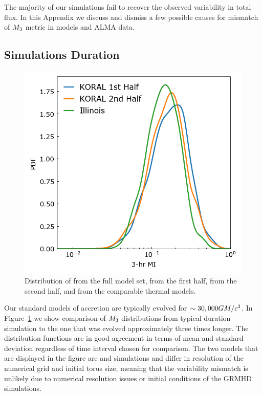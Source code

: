 

The majority of our simulations fail to recover the \sgra observed variability in total flux.  In this Appendix we discuss and dismiss a few possible causes for mismatch of $M_{3}$ metric in models and ALMA data.

\subsection{Simulations Duration}\label{app:narayan}

\begin{figure}
  \centering
  \includegraphics[width=\columnwidth]{./figures/Koral_vs_IL_MI.png}
  \caption{Distribution of  from the full \koral model set, from the first half, from the second half, and from the comparable \kharma thermal models.}
  \label{fig:koral_MI}
\end{figure}

Our standard models of accretion are typically evolved for $\sim 30,000 GM/c^3$. In Figure~\ref{fig:koral_MI} we show comparison of $M_{3}$ distributions from typical duration simulation to the one that was evolved approximately three times longer. The distribution functions are in good agreement in terms of mean and standard deviation regardless of time interval chosen for comparison. The two models that are displayed in the figure are \kharma and \koral simulations and differ in resolution of the numerical grid and initial torus size, meaning that the variability mismatch is unlikely due to numerical resolution issues or initial conditions of the GRMHD simulations.

